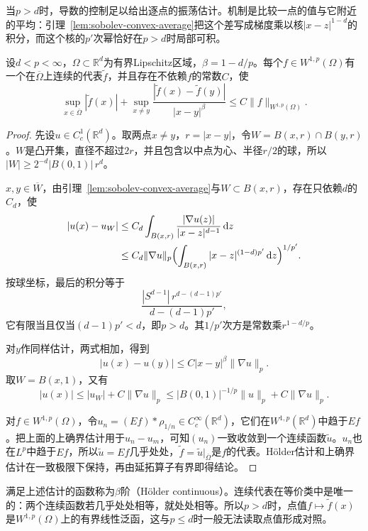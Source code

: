 当$p>d$时，导数的控制足以给出逐点的振荡估计。机制是比较一点的值与它附近的平均：引理~\ref{lem:sobolev-convex-average}把这个差写成梯度乘以核$|x-z|^{1-d}$的积分，而这个核的$p'$次幂恰好在$p>d$时局部可积。

\begin{theorem}[Hölder连续代表]
\label{thm:sobolev-morrey}
设$d<p<\infty$，$\Omega\subset\mathbb R^d$为有界Lipschitz区域，$\beta=1-d/p$。每个$f\in W^{1,p}(\Omega)$有一个在$\overline\Omega$上连续的代表$\tilde f$，并且存在不依赖$f$的常数$C$，使
\begin{equation}
\sup_{x\in\overline\Omega}|\tilde f(x)|
+\sup_{x\neq y}\frac{|\tilde f(x)-\tilde f(y)|}{|x-y|^\beta}
\leq C\lVert f\rVert_{W^{1,p}(\Omega)} .
\label{eq:sobolev-morrey}
\end{equation}
\end{theorem}

\begin{proof}
先设$u\in C_c^1(\mathbb R^d)$。取两点$x\neq y$，$r=|x-y|$，令$W=B(x,r)\cap B(y,r)$。$W$是凸开集，直径不超过$2r$，并且包含以中点为心、半径$r/2$的球，所以$|W|\geq2^{-d}|B(0,1)|\,r^d$。

$x,y\in\overline W$，由引理~\ref{lem:sobolev-convex-average}与$W\subset B(x,r)$，存在只依赖$d$的$C_d$，使
\[
\begin{aligned}
|u(x)-u_W|&\leq C_d\int_{B(x,r)}\frac{|\nabla u(z)|}{|x-z|^{d-1}}\,\mathrm dz\\
&\leq C_d\lVert\nabla u\rVert_p\Bigl(\int_{B(x,r)}|x-z|^{(1-d)p'}\,\mathrm dz\Bigr)^{1/p'} .
\end{aligned}
\]
按球坐标，最后的积分等于
\[
\frac{|S^{d-1}|\,r^{d-(d-1)p'}}{d-(d-1)p'},
\]
它有限当且仅当$(d-1)p'<d$，即$p>d$。其$1/p'$次方是常数乘$r^{1-d/p}$。

对$y$作同样估计，两式相加，得到
\[
|u(x)-u(y)|\leq C|x-y|^\beta\lVert\nabla u\rVert_p .
\]
取$W=B(x,1)$，又有
\[
|u(x)|\leq|u_W|+C\lVert\nabla u\rVert_p\leq|B(0,1)|^{-1/p}\lVert u\rVert_p+C\lVert\nabla u\rVert_p .
\]

对$f\in W^{1,p}(\Omega)$，令$u_n=(Ef)*\rho_{1/n}\in C_c^\infty(\mathbb R^d)$，它们在$W^{1,p}(\mathbb R^d)$中趋于$Ef$。把上面的上确界估计用于$u_n-u_m$，可知$(u_n)$一致收敛到一个连续函数$\tilde u$。$u_n$也在$L^p$中趋于$Ef$，所以$\tilde u=Ef$几乎处处，$\tilde f=\tilde u|_{\overline\Omega}$是$f$的代表。Hölder估计和上确界估计在一致极限下保持，再由延拓算子有界即得结论。
\end{proof}

满足上述估计的函数称为$\beta$阶（Hölder continuous）。连续代表在等价类中是唯一的：两个连续函数若几乎处处相等，就处处相等。所以$p>d$时，点值$f\mapsto\tilde f(x)$是$W^{1,p}(\Omega)$上的有界线性泛函，这与$p\leq d$时一般无法读取点值形成对照。

